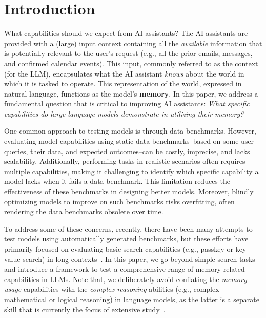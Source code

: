 \section{Introduction}

What capabilities should we expect from AI assistants? The AI assistants are provided with a (large) input context containing all the \textit{available} information that is potentially relevant to the user's request (e.g., all the prior emails, messages, and confirmed calendar events). This input, commonly referred to as the context (for the LLM), encapsulates what the AI assistant \textit{knows} about the world in which it is tasked to operate. This representation of the world, expressed in natural language, functions as the model's \textbf{memory}. In this paper, we address a fundamental question that is critical to improving AI assistants: \textit{What specific capabilities do large language models demonstrate in utilizing their memory?} 

One common approach to testing models is through data benchmarks. However, evaluating model capabilities using static data benchmarks--based on some user queries, their data, and expected outcomes--can be costly, imprecise, and lacks scalability. Additionally, performing tasks in realistic scenarios often requires multiple capabilities, making it challenging to identify which specific capability a model lacks when it fails a data benchmark. This limitation reduces the effectiveness of these benchmarks in designing better models. Moreover, blindly optimizing models to improve on such benchmarks risks overfitting, often rendering the data benchmarks obsolete over time.

To address some of these concerns, recently, there have been many attempts to test models using automatically generated benchmarks, but these efforts have primarily focused on evaluating basic search capabilities (e.g., passkey or key-value search) in long-contexts~\cite{kamradt2023, liu-etal-2024-lost, zhang-etal-2024-bench, anthropic2024b, wu2024longgenbench, li2024needlebench,hsieh2024ruler}. In this paper, we go beyond simple search tasks and introduce a framework to test a comprehensive range of memory-related capabilities in LLMs. Note that, we deliberately avoid conflating the \textit{memory usage} capabilities with the \textit{complex reasoning} abilities (e.g., complex mathematical or logical reasoning) in language models, as the latter is a separate skill that is currently the focus of extensive study~\cite{clark2018thinksolvedquestionanswering, cobbe2021gsm8k, hendrycksmath2021, suzgun2022challenging}.

